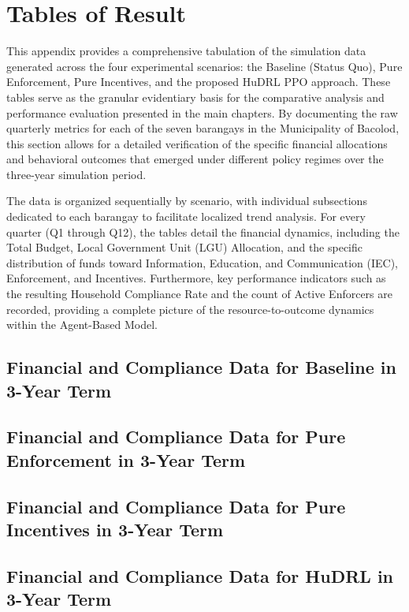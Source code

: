 \chapter{Tables of Result}
\label{ch:appendix_c}

This appendix provides a comprehensive tabulation of the simulation data generated across the four experimental scenarios: the Baseline (Status Quo), Pure Enforcement, Pure Incentives, and the proposed HuDRL PPO approach. These tables serve as the granular evidentiary basis for the comparative analysis and performance evaluation presented in the main chapters. By documenting the raw quarterly metrics for each of the seven barangays in the Municipality of Bacolod, this section allows for a detailed verification of the specific financial allocations and behavioral outcomes that emerged under different policy regimes over the three-year simulation period.

The data is organized sequentially by scenario, with individual subsections dedicated to each barangay to facilitate localized trend analysis. For every quarter (Q1 through Q12), the tables detail the financial dynamics, including the Total Budget, Local Government Unit (LGU) Allocation, and the specific distribution of funds toward Information, Education, and Communication (IEC), Enforcement, and Incentives. Furthermore, key performance indicators such as the resulting Household Compliance Rate and the count of Active Enforcers are recorded, providing a complete picture of the resource-to-outcome dynamics within the Agent-Based Model.

\newpage 

\begin{landscape} 

\section{Financial and Compliance Data for Baseline in 3-Year Term}
\label{sec:baseline_results}

\newpage

\section{Financial and Compliance Data for Pure Enforcement in 3-Year Term}
\label{sec:pure_enforcement}

\newpage

\section{Financial and Compliance Data for Pure Incentives in 3-Year Term}
\label{sec:pure_incentives}

\newpage

\section{Financial and Compliance Data for HuDRL in 3-Year Term}
\label{sec:hudrl_results}


\end{landscape} %